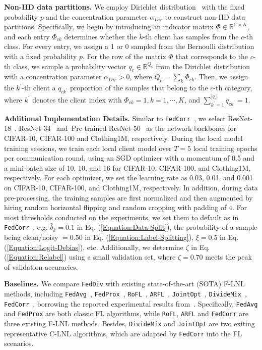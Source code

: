 \documentclass[letterpaper]{article} %
\begin{document}
\noindent
\textbf{Non-IID data partitions.}
We employ Dirichlet distribution~\cite{lin2020ensemble}  with the fixed probability $p$ and the concentration parameter $\alpha_{Dir}$ to construct non-IID data partitions. Specifically, we begin by introducing an indicator matrix $\Phi \in {\mathbb{R}}^{C \times K}$, and each entry ${\Phi}_{ck}$ determines whether the $k$-th client has samples from the $c$-th class. For every entry, we assign a 1 or 0 sampled from the Bernoulli distribution with a fixed probability $p$. For the row of the matrix $\Phi$ that corresponds to the $c$-th class, we sample a probability vector $q_c\in {\mathbb{R}}^{{Q}_{c}}$ from the Dirichlet distribution with a concentration parameter $\alpha_{Dir} > 0$, where ${Q}_{c}=\sum_{k} {\Phi}_{ck}$. Then, we assign the ${k}^{\prime}$-th client a $q_{c{k}^{\prime}}$ proportion of the samples that belong to the $c$-th category, where ${k}^{\prime}$ denotes the client index with ${\Phi}_{ck}=1, k=1, \cdots, K$, and $\sum_{k^{\prime}=1}^{|q_c|} q_{c{k}^{\prime}}=1$.

\noindent
{\bf Additional Implementation Details.}
Similar to \texttt{FedCorr}~\cite{xu2022fedcorr}, we select ResNet-18~\cite{resnet}, ResNet-34~\cite{resnet} and~Pre-trained ResNet-50~\cite{resnet} as the network backbones for CIFAR-10, CIFAR-100 and Clothing1M, respectively. During the local model training sessions, we train each local client model over $T=5$ local training epochs per communication round, using an SGD optimizer with a momentum of 0.5 and a mini-batch size of 10, 10, and 16 for CIFAR-10, CIFAR-100, and Clothing1M, respectively.
For each optimizer, we set the learning rate as 0.03, 0.01, and 0.001 on CIFAR-10, CIFAR-100, and Clothing1M, respectively. In addition, during data pre-processing, the training samples are first normalized and then augmented by hiring random horizontal flipping and random cropping with padding of 4. For most thresholds conducted on the experiments, we set them to default as in \texttt{FedCorr}~\cite{xu2022fedcorr}, e.g.  {$\hat{\delta}_{k}=0.1$} in {Eq. (\ref{Equation:Data-Split})}, the probability of a sample being clean/noisy {$= 0.50$} in {Eq. (\ref{Equation:Label-Splitting})}, {$\xi=0.5$} in {Eq. (\ref{Equation:Logit-Debias})}, etc. Additionally, we determine {$\zeta$} in{ Eq. (\ref{Equation:Relabel})} using a small validation set, where $\zeta=0.70$ meets the peak of validation accuracies.


\noindent
{\bf Baselines.}
We compare \texttt{FedDiv} with existing state-of-the-art (SOTA) F-LNL methods, including \texttt{FedAvg}~\cite{FedAvg}, \texttt{FedProx}~\cite{FedProx}, \texttt{RoFL}~\cite{RoFL}, \texttt{ARFL}~\cite{RoFL}, \texttt{JointOpt}~\cite{JointOpt}, \texttt{DivideMix}~\cite{li2019dividemix}, \texttt{FedCorr}~\cite{xu2022fedcorr}, borrowing the reported experimental results from~\cite{xu2022fedcorr}. Specifically, \texttt{FedAvg} and \texttt{FedProx} are both classic FL algorithms, while \texttt{RoFL}, \texttt{ARFL} and \texttt{FedCorr} are three existing F-LNL methods. Besides, \texttt{DivideMix} and \texttt{JointOpt} are two exiting representative C-LNL algorithms, which are adapted by \texttt{FedCorr}  into the FL scenarios.
\end{document}
